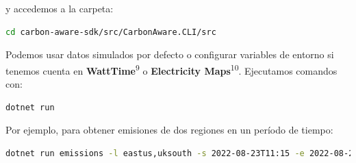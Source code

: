 \documentclass[12pt,a4paper]{report}
\begin{document}
y accedemos a la carpeta:

\begin{tcolorbox}[colback=codebackground, colframe=codeborder, boxrule=0.8pt, arc=0mm, boxsep=5pt, left=5pt, right=5pt, top=5pt, bottom=5pt]
\begin{lstlisting}[language=bash]
cd carbon-aware-sdk/src/CarbonAware.CLI/src
\end{lstlisting}
\end{tcolorbox}

Podemos usar datos simulados por defecto o configurar variables de entorno si tenemos cuenta en \textbf{WattTime}\textsuperscript{9} o \textbf{Electricity Maps}\textsuperscript{10}. Ejecutamos comandos con:

\begin{tcolorbox}[colback=codebackground, colframe=codeborder, boxrule=0.8pt, arc=0mm, boxsep=5pt, left=5pt, right=5pt, top=5pt, bottom=5pt]
\begin{lstlisting}[language=bash]
dotnet run
\end{lstlisting}
\end{tcolorbox}

Por ejemplo, para obtener emisiones de dos regiones en un período de tiempo:

\begin{tcolorbox}[colback=codebackground, colframe=codeborder, boxrule=0.8pt, arc=0mm, boxsep=5pt, left=5pt, right=5pt, top=5pt, bottom=5pt]
\begin{lstlisting}[language=bash]
dotnet run emissions -l eastus,uksouth -s 2022-08-23T11:15 -e 2022-08-23T11:20
\end{lstlisting}
\end{tcolorbox}
\end{document}
